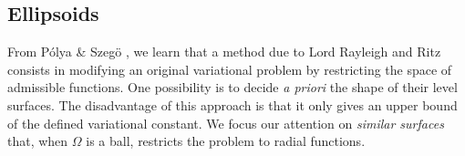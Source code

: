 \documentclass[11pt]{article}
\theoremstyle{plain}
\theoremstyle{definition}
\numberwithin{equation}{section}
\begin{document}
\subsection{Ellipsoids}\label{sec:ellipsoids}

From P{\'o}lya \& Szeg{\"o} \cite[Section 1.29]{polya1953isoperimetric}, we learn that a method due to Lord Rayleigh and Ritz consists in modifying an original
variational problem by restricting the space of admissible functions. One possibility is to decide {\em a priori} the shape of their level surfaces. The disadvantage of this approach is that it only gives
an upper bound of the defined variational constant. We focus our attention on {\em similar surfaces} \cite[Section 3.5]{polya1953isoperimetric} that, when $\Omega$ is a ball, restricts the problem to
radial functions.
\end{document}

